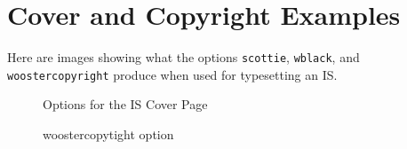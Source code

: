 \chapter{Cover and Copyright Examples}\label{options}
Here are images showing what the options \verb|scottie|, \verb|wblack|, and \verb|woostercopyright| produce when used for typesetting an IS.
\begin{figure}[!ht]\centering
{}
\qquad
{}
\caption{Options for the IS Cover Page}\label{cover}
\end{figure}
\begin{figure}[!ht]
\begin{center}
\end{center}
\caption{woostercopytight option}\label{copyright}
\end{figure}